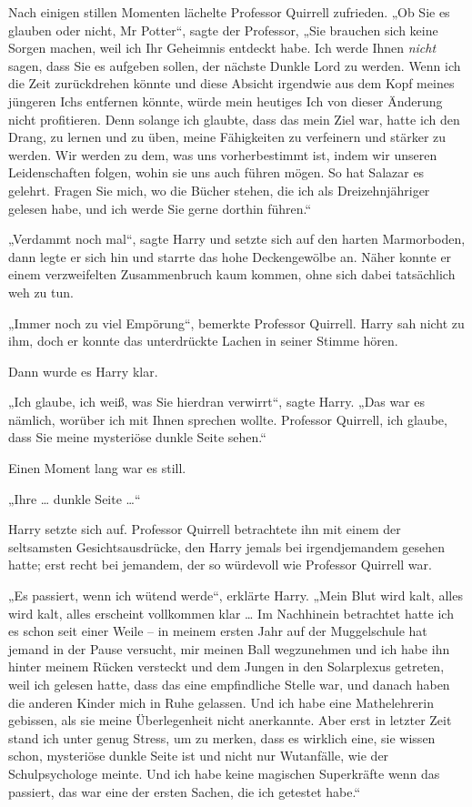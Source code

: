 {Nach einigen stillen Momenten lächelte Professor Quirrell zufrieden. „Ob Sie es glauben oder nicht, Mr Potter“, sagte der Professor, „Sie brauchen sich keine Sorgen machen, weil ich Ihr Geheimnis entdeckt habe. Ich werde Ihnen \emph{nicht} sagen, dass Sie es aufgeben sollen, der nächste Dunkle Lord zu werden. Wenn ich die Zeit zurückdrehen könnte und diese Absicht irgendwie aus dem Kopf meines jüngeren Ichs entfernen könnte, würde mein heutiges Ich von dieser Änderung nicht profitieren. Denn solange ich glaubte, dass das mein Ziel war, hatte ich den Drang, zu lernen und zu üben, meine Fähigkeiten zu verfeinern und stärker zu werden. Wir werden zu dem, was uns vorherbestimmt ist, indem wir unseren Leidenschaften folgen, wohin sie uns auch führen mögen. So hat Salazar es gelehrt. Fragen Sie mich, wo die Bücher stehen, die ich als Dreizehnjähriger gelesen habe, und ich werde Sie gerne dorthin führen.“

„Verdammt noch mal“, sagte Harry und setzte sich auf den harten Marmorboden, dann legte er sich hin und starrte das hohe Deckengewölbe an. Näher konnte er einem verzweifelten Zusammenbruch kaum kommen, ohne sich dabei tatsächlich weh zu tun.

„Immer noch zu viel Empörung“, bemerkte Professor Quirrell. Harry sah nicht zu ihm, doch er konnte das unterdrückte Lachen in seiner Stimme hören.

Dann wurde es Harry klar.

„Ich glaube, ich weiß, was Sie hierdran verwirrt“, sagte Harry. „Das war es nämlich, worüber ich mit Ihnen sprechen wollte. Professor Quirrell, ich glaube, dass Sie meine mysteriöse dunkle Seite sehen.“

Einen Moment lang war es still.

„Ihre … dunkle Seite …“

Harry setzte sich auf. Professor Quirrell betrachtete ihn mit einem der seltsamsten Gesichtsausdrücke, den Harry jemals bei irgendjemandem gesehen hatte; erst recht bei jemandem, der so würdevoll wie Professor Quirrell war.

„Es passiert, wenn ich wütend werde“, erklärte Harry. „Mein Blut wird kalt, alles wird kalt, alles erscheint vollkommen klar … Im Nachhinein betrachtet hatte ich es schon seit einer Weile -- in meinem ersten Jahr auf der Muggelschule hat jemand in der Pause versucht, mir meinen Ball wegzunehmen und ich habe ihn hinter meinem Rücken versteckt und dem Jungen in den Solarplexus getreten, weil ich gelesen hatte, dass das eine empfindliche Stelle war, und danach haben die anderen Kinder mich in Ruhe gelassen. Und ich habe eine Mathelehrerin gebissen, als sie meine Überlegenheit nicht anerkannte. Aber erst in letzter Zeit stand ich unter genug Stress, um zu merken, dass es wirklich eine, sie wissen schon, mysteriöse dunkle Seite ist und nicht nur Wutanfälle, wie der Schulpsychologe meinte. Und ich habe keine magischen Superkräfte wenn das passiert, das war eine der ersten Sachen, die ich getestet habe.“

}
